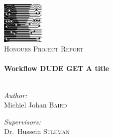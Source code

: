 \begin{titlepage}

\begin{center}


\includegraphics[width=0.15\textwidth]{./images/cslogo}\\[1cm]


\textsc{\Large Honours Project Report}\\[0.5cm]


\HRule \\[0.4cm]
{ \huge \bfseries Workflow DUDE GET A title}\\[0.4cm]

\HRule \\[1.5cm]

\begin{minipage}{0.4\textwidth}
\begin{flushleft} \large
\emph{Author:}\\
Michiel Johan \textsc{Baird}
\end{flushleft}
\end{minipage}
\begin{minipage}{0.4\textwidth}
\begin{flushright} \large
\emph{Supervisors:} \\
Dr.~Hussein \textsc{Suleman}
\end{flushright}
\end{minipage}


\end{center}
\end{titlepage}
